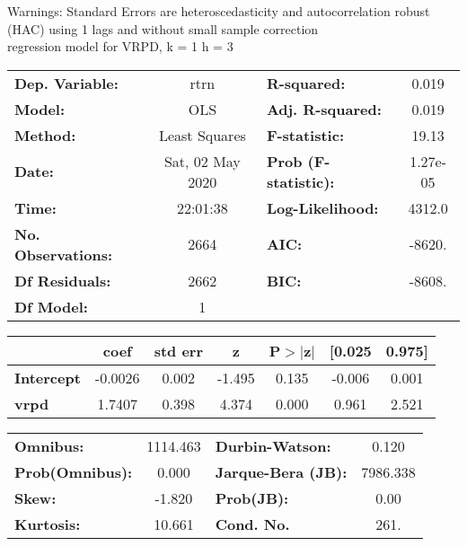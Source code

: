 Warnings: \newline
 [1] Standard Errors are heteroscedasticity and autocorrelation robust (HAC) using 1 lags and without small sample correction\\ 

regression model for VRPD, k = 1 h = 3\begin{center}
\begin{tabular}{lclc}
\toprule
\textbf{Dep. Variable:}    &       rtrn       & \textbf{  R-squared:         } &     0.019   \\
\textbf{Model:}            &       OLS        & \textbf{  Adj. R-squared:    } &     0.019   \\
\textbf{Method:}           &  Least Squares   & \textbf{  F-statistic:       } &     19.13   \\
\textbf{Date:}             & Sat, 02 May 2020 & \textbf{  Prob (F-statistic):} &  1.27e-05   \\
\textbf{Time:}             &     22:01:38     & \textbf{  Log-Likelihood:    } &    4312.0   \\
\textbf{No. Observations:} &        2664      & \textbf{  AIC:               } &    -8620.   \\
\textbf{Df Residuals:}     &        2662      & \textbf{  BIC:               } &    -8608.   \\
\textbf{Df Model:}         &           1      & \textbf{                     } &             \\
\bottomrule
\end{tabular}
\begin{tabular}{lcccccc}
                   & \textbf{coef} & \textbf{std err} & \textbf{z} & \textbf{P$> |$z$|$} & \textbf{[0.025} & \textbf{0.975]}  \\
\midrule
\textbf{Intercept} &      -0.0026  &        0.002     &    -1.495  &         0.135        &       -0.006    &        0.001     \\
\textbf{vrpd}      &       1.7407  &        0.398     &     4.374  &         0.000        &        0.961    &        2.521     \\
\bottomrule
\end{tabular}
\begin{tabular}{lclc}
\textbf{Omnibus:}       & 1114.463 & \textbf{  Durbin-Watson:     } &    0.120  \\
\textbf{Prob(Omnibus):} &   0.000  & \textbf{  Jarque-Bera (JB):  } & 7986.338  \\
\textbf{Skew:}          &  -1.820  & \textbf{  Prob(JB):          } &     0.00  \\
\textbf{Kurtosis:}      &  10.661  & \textbf{  Cond. No.          } &     261.  \\
\bottomrule
\end{tabular}
\end{center}

